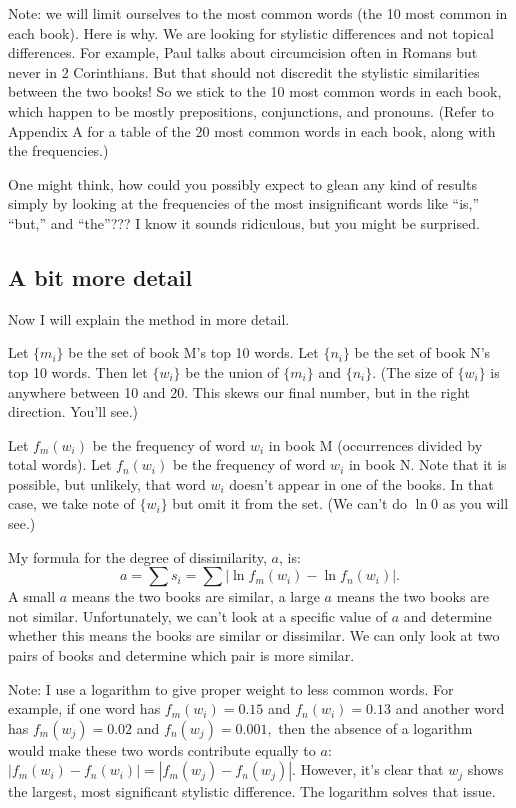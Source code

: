 \documentclass[12pt,letterpaper]{article}
\begin{document}
Note: we will limit ourselves to the most common words (the 10 most common in each book).  Here is why.  We are looking for stylistic differences and not topical differences.  For example, Paul talks about circumcision often in Romans but never in 2 Corinthians.  But that should not discredit the stylistic similarities between the two books!  So we stick to the 10 most common words in each book, which happen to be mostly prepositions, conjunctions, and pronouns.  (Refer to Appendix A for a table of the 20 most common words in each book, along with the frequencies.)

One might think, how could you possibly expect to glean any kind of results simply by looking at the frequencies of the most insignificant words like ``is,'' ``but,'' and ``the''???  I know it sounds ridiculous, but you might be surprised.

\subsection{A bit more detail}

Now I will explain the method in more detail.

Let $\{m_i\}$ be the set of book M's top 10 words.  Let $\{n_i\}$ be the set of book N's top 10 words.  Then let $\{w_i\}$ be the union of $\{m_i\}$ and $\{n_i\}.$  (The size of $\{w_i\}$ is anywhere between 10 and 20.  This skews our final number, but in the right direction.  You'll see.)

Let $f_m(w_i)$ be the frequency of word $w_i$ in book M (occurrences divided by total words).  Let $f_n(w_i)$ be the frequency of word $w_i$ in book N.  Note that it is possible, but unlikely, that word $w_i$ doesn't appear in one of the books.  In that case, we take note of $\{w_i\}$ but omit it from the set.  (We can't do $\ln 0$ as you will see.)

My formula for the degree of dissimilarity, $a$, is:
\begin{equation*}
a = \sum s_i = \sum |\ln f_m(w_i) - \ln f_n(w_i)|.
\end{equation*}
A small $a$ means the two books are similar, a large $a$ means the two books are not similar.  Unfortunately, we can't look at a specific value of $a$ and determine whether this means the books are similar or dissimilar.  We can only look at two pairs of books and determine which pair is more similar.  

Note: I use a logarithm to give proper weight to less common words.  For example, if one word has $f_m(w_i) = 0.15$ and $f_n(w_i) = 0.13$ and another word has $f_m(w_{j}) = 0.02$ and $f_n(w_{j}) = 0.001,$ then the absence of a logarithm would make these two words contribute equally to $a$: $|f_m(w_i) - f_n(w_i)| = |f_m(w_j) - f_n(w_j)|.$  However, it's clear that $w_{j}$ shows the largest, most significant stylistic difference.  The logarithm solves that issue.
\end{document}
